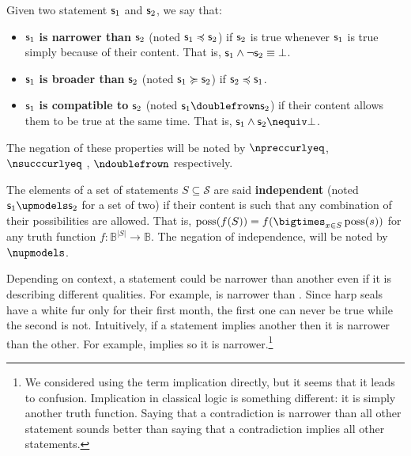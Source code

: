\documentclass[11pt,letterpaper,fleqn]{memoir} %
\begin{document}
\begin{mathSection}

\begin{defn}
	Given two statement $\mathsf{s}_1$ and $\mathsf{s}_2$, we say that:
	\begin{itemize}
		\item $\mathsf{s}_1$ \textbf{is narrower than} $\mathsf{s}_2$ (noted $\mathsf{s}_1 \preccurlyeq \mathsf{s}_2$) if $\mathsf{s}_2$ is true whenever $\mathsf{s}_1$ is true simply because of their content. That is, $\mathsf{s}_1 \wedge \neg \mathsf{s}_2 \equiv \bot$.
		\item $\mathsf{s}_1$ \textbf{is broader than} $\mathsf{s}_2$ (noted $\mathsf{s}_1 \succcurlyeq \mathsf{s}_2$) if $\mathsf{s}_2 \preccurlyeq \mathsf{s}_1$.
		\item $\mathsf{s}_1$ \textbf{is compatible to} $\mathsf{s}_2$ (noted $\stmt_1 \comp \stmt_2$) if their content allows them to be true at the same time. That is, $\stmt_1 \AND \stmt_2 \nequiv \contradiction$.

	\end{itemize}
	The negation of these properties will be noted by $\nnarrower$, $\nbroader$ , $\ncomp$ respectively.
\end{defn}
\begin{defn}
	The elements of a set of statements $S \subseteq \mathcal{S}$ are said \textbf{independent} (noted $\stmt_1 \indep \stmt_2$ for a set of two) if their content is such that any combination of their possibilities are allowed. That is, $\poss(f(S)) = f(\bigtimes_{x \in S} \poss(s))$ for any truth function $f : \mathbb{B}^{|S|} \to \mathbb{B}$. The negation of independence, will be noted by $\nindep$.
\end{defn}

\end{mathSection}

Depending on context, a statement could be narrower than another even if it is describing different qualities. For example,  is narrower than . Since harp seals have a white fur only for their first month, the first one can never be true while the second is not. Intuitively, if a statement implies another then it is narrower than the other. For example,  implies  so it is narrower.\footnote{We considered using the term implication directly, but it seems that it leads to confusion. Implication in classical logic is something different: it is simply another truth function. Saying that a contradiction is narrower than all other statement sounds better than saying that a contradiction implies all other statements.}
\end{document}
